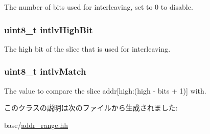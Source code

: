 The number of bits used for interleaving, set to 0 to disable. \hypertarget{classAddrRange_a4160474d6dec766ee20330ae309e3998}{
\subsubsection[{intlvHighBit}]{\setlength{\rightskip}{0pt plus 5cm}uint8\_\-t {\bf intlvHighBit}}}
\label{classAddrRange_a4160474d6dec766ee20330ae309e3998}


The high bit of the slice that is used for interleaving. \hypertarget{classAddrRange_a0d9068b55e0d449e9b8ec483536394a9}{
\subsubsection[{intlvMatch}]{\setlength{\rightskip}{0pt plus 5cm}uint8\_\-t {\bf intlvMatch}}}
\label{classAddrRange_a0d9068b55e0d449e9b8ec483536394a9}
The value to compare the slice addr\mbox{[}high:(high -\/ bits + 1)\mbox{]} with. 

このクラスの説明は次のファイルから生成されました:\begin{DoxyCompactItemize}
\item 
base/\hyperlink{addr__range_8hh}{addr\_\-range.hh}\end{DoxyCompactItemize}
